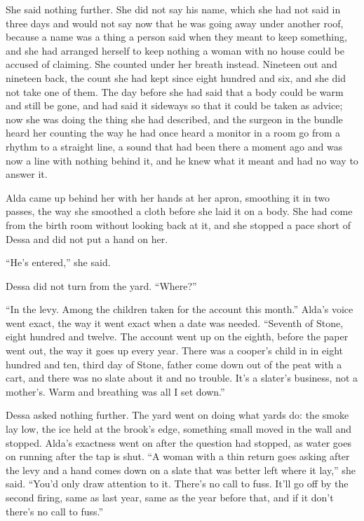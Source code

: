She said nothing further. She did not say his name, which she had not said in three days and would not say now that he was going away under another roof, because a name was a thing a person said when they meant to keep something, and she had arranged herself to keep nothing a woman with no house could be accused of claiming. She counted under her breath instead. Nineteen out and nineteen back, the count she had kept since eight hundred and six, and she did not take one of them. The day before she had said that a body could be warm and still be gone, and had said it sideways so that it could be taken as advice; now she was doing the thing she had described, and the surgeon in the bundle heard her counting the way he had once heard a monitor in a room go from a rhythm to a straight line, a sound that had been there a moment ago and was now a line with nothing behind it, and he knew what it meant and had no way to answer it.

Alda came up behind her with her hands at her apron, smoothing it in two passes, the way she smoothed a cloth before she laid it on a body. She had come from the birth room without looking back at it, and she stopped a pace short of Dessa and did not put a hand on her.

“He's entered,” she said.

Dessa did not turn from the yard. “Where?”

“In the levy. Among the children taken for the account this month.” Alda's voice went exact, the way it went exact when a date was needed. “Seventh of Stone, eight hundred and twelve. The account went up on the eighth, before the paper went out, the way it goes up every year. There was a cooper's child in  in eight hundred and ten, third day of Stone, father come down out of the peat with a cart, and there was no slate about it and no trouble. It's a slater's business, not a mother's. Warm and breathing was all I set down.”

Dessa asked nothing further. The yard went on doing what yards do: the smoke lay low, the ice held at the brook's edge, something small moved in the wall and stopped. Alda's exactness went on after the question had stopped, as water goes on running after the tap is shut. “A woman with a thin return goes asking after the levy and a hand comes down on a slate that was better left where it lay,” she said. “You'd only draw attention to it. There's no call to fuss. It'll go off by the second firing, same as last year, same as the year before that, and if it don't there's no call to fuss.”

